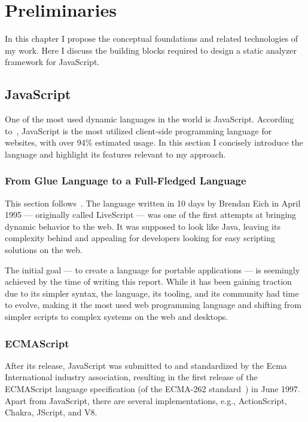 \chapter{Preliminaries}
\label{chap:preliminaries}

In this chapter I propose the conceptual foundations and related technologies of my work. Here I discuss the building blocks required to design a static analyzer framework for JavaScript.

\section{JavaScript}
One of the most used dynamic languages in the world is JavaScript. According to~\cite{js-usage}, JavaScript is the most utilized client-side programming language for websites, with over 94\% estimated usage. In this section I concisely introduce the language and highlight its features relevant to my approach.

\subsection{From Glue Language to a Full-Fledged Language}
This section follows~\cite{10.1109/MC.2012.57}. The language written in 10 days by Brendan Eich in April 1995 --- originally called LiveScript --- was one of the first attempts at bringing dynamic behavior to the web. It was supposed to look like Java, leaving its complexity behind and appealing for developers looking for easy scripting solutions on the web.

The initial goal --- to create a language for portable applications --- is seemingly achieved by the time of writing this report. While it has been gaining traction due to its simpler syntax, the language, its tooling, and its community had time to evolve, making it the most used web programming language and shifting from simpler scripts to complex systems on the web and desktops.

\subsection{ECMAScript}
\label{sect:ecmascript}
After its release, JavaScript was submitted to and standardized by the Ecma International industry association, resulting in the first release of the ECMAScript language specification (of the ECMA-262 standard~\cite{ecma-262}) in June 1997. Apart from JavaScript, there are several implementations, e.g., ActionScript, Chakra, JScript, and V8.

